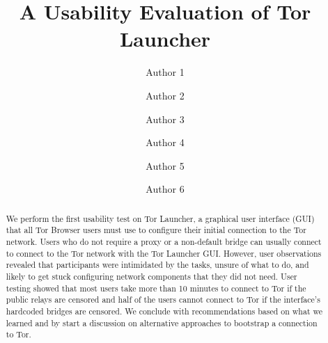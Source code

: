 \documentclass[USenglish,oneside,twocolumn]{article}
\begin{document}
   \author*[1]{Author 1}

  \author[2]{Author 2}

  \author[3]{Author 3}

  \author[4]{Author 4}

  \author[5]{Author 5}
  
  \author[6]{Author 6}

%
%
%
%
%  
%
%
%
%
%  
%   

  \title{\huge A Usability Evaluation of Tor Launcher}



  \begin{abstract}
{
We perform the first usability test on Tor Launcher, a graphical user interface (GUI) that all Tor Browser users must use to configure their initial connection to the Tor network. Users who do not require a proxy or a non-default bridge can usually connect to connect to the Tor network with the Tor Launcher GUI. However, user observations revealed that participants were intimidated by the tasks, unsure of what to do, and likely to get stuck configuring network components that they did not need. User testing showed that most users take more than 10 minutes to connect to Tor if the public relays are censored and half of the users cannot connect to Tor if the interface's hardcoded bridges are censored. We conclude with recommendations based on what we learned and by start a discussion on alternative 
approaches to bootstrap a connection to Tor. 
}
\end{abstract}
\end{document}
